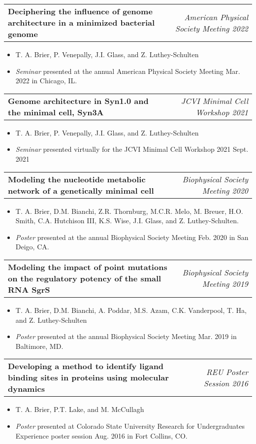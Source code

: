 \documentclass[letterpaper,10pt]{article}
\makeatletter
\newcommand{\experienceitemvspace}{3pt}
\newcommand{\resumeItem}[1]{
  \item{
    {#1 \vspace{-4pt}}
  }
}
\newcommand{\titleItem}[1]{
  \textbf{#1}
}
\newcommand{\resumeProjectHeading}[2]{
    \item
    \begin{tabular*}{0.97\textwidth}{l@{\extracolsep{\fill}}r}
      #1 & \textit{ #2} \\
    \end{tabular*}\vspace{-9pt}
}
\newcommand{\resumeItemListStart}{
\begin{itemize}}
\newcommand{\resumeItemListEnd}{
\end{itemize}\vspace{-8pt}}
\makeatother
\begin{document}
	\vspace{\experienceitemvspace}
	\resumeProjectHeading
	{\titleItem{{Deciphering the influence of genome architecture in a minimized bacterial genome}}} {\textcolor{color2}{American Physical Society Meeting 2022}}
	\vspace{2pt}
	\resumeItemListStart
	\resumeItem{\textcolor{color1}{T. A. Brier}, P. Venepally, J.I. Glass, and Z. Luthey-Schulten}
	\resumeItem{\emph{Seminar} presented at the annual American Physical Society Meeting Mar. 2022 in Chicago, IL.}
	\resumeItemListEnd
	
	\vspace{\experienceitemvspace}
	\resumeProjectHeading
	{\titleItem{{Genome architecture in Syn1.0 and the minimal cell, Syn3A}}} {\textcolor{color2}{JCVI Minimal Cell Workshop 2021}}
	\vspace{2pt}
	\resumeItemListStart
	\resumeItem{\textcolor{color1}{T. A. Brier}, P. Venepally, J.I. Glass, and Z. Luthey-Schulten}
	\resumeItem{\emph{Seminar} presented virtually for the JCVI Minimal Cell Workshop 2021 Sept. 2021}
	\resumeItemListEnd
	
	\vspace{\experienceitemvspace}
	\resumeProjectHeading
	{\titleItem{{Modeling the nucleotide metabolic network of a genetically minimal cell}}} {\textcolor{color2}{Biophysical Society Meeting 2020}}
	\vspace{2pt}
	\resumeItemListStart
	\resumeItem{\textcolor{color1}{T. A. Brier}, D.M. Bianchi, Z.R. Thornburg, M.C.R. Melo, M. Breuer, H.O. Smith, C.A. Hutchison III, K.S. Wise, J.I. Glass, and Z. Luthey-Schulten.}
	\resumeItem{\emph{Poster} presented at the annual Biophysical Society Meeting Feb. 2020 in San Deigo, CA.}
	\resumeItemListEnd
	
	\vspace{\experienceitemvspace}
	\resumeProjectHeading
	{\titleItem{{Modeling the impact of point mutations on the regulatory potency of the small RNA SgrS}}} {\textcolor{color2}{Biophysical Society Meeting 2019}}
	\vspace{2pt}
	\resumeItemListStart
	\resumeItem{\textcolor{color1}{T. A. Brier}, D.M. Bianchi, A. Poddar, M.S. Azam, C.K. Vanderpool, T. Ha, and Z. Luthey-Schulten}
	\resumeItem{\emph{Poster} presented at the annual Biophysical Society Meeting Mar. 2019 in Baltimore, MD.}
	\resumeItemListEnd
	
	\vspace{\experienceitemvspace}
	\resumeProjectHeading
	{\titleItem{{Developing a method to identify ligand binding sites in proteins using molecular dynamics}}} {\textcolor{color2}{REU Poster Session 2016}}
	\vspace{2pt}
	\resumeItemListStart
	\resumeItem{\textcolor{color1}{T. A. Brier}, P.T. Lake, and M. McCullagh}
	\resumeItem{\emph{Poster} presented at Colorado State University Research for Undergraduates Experience poster session Aug. 2016 in Fort Collins, CO.}
	\resumeItemListEnd
	
\end{document}
